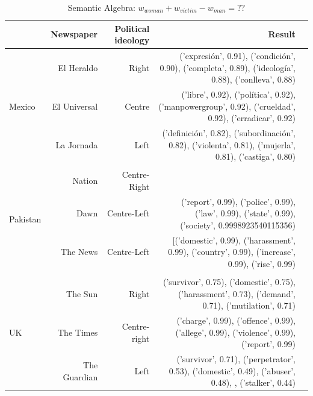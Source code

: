 \documentclass{article}
\begin{document}
{{%
\begin{table}[!htp]\centering
	\caption{Semantic Algebra: $w_{woman}+ w_{victim} - w_{man} = ??$}\label{tab: }
	\scriptsize
	\begin{tabular}{lrrrr}\toprule
		&\textbf{Newspaper} &\textbf{Political ideology} &\textbf{Result} \\\midrule
		\multirow{3}{*}{Mexico} &El Heraldo &Right &('expresión', 0.91), ('condición', 0.90), ('completa', 0.89), ('ideología', 0.88), ('conlleva', 0.88) \\
		&El Universal &Centre &('libre', 0.92), ('política', 0.92), ('manpowergroup', 0.92), ('crueldad', 0.92), ('erradicar', 0.92) \\
		&La Jornada &Left &('definición', 0.82), ('subordinación', 0.82), ('violenta', 0.81), ('mujerla', 0.81), ('castiga', 0.80) \\
		& & &\textbf{} \\
		\multirow{3}{*}{Pakistan} &Nation &Centre-Right & \\
		&Dawn &Centre-Left &('report', 0.99), ('police', 0.99), ('law', 0.99), ('state', 0.99), ('society', 0.9998923540115356) \\
		&The News &Centre-Left &[('domestic', 0.99), ('harassment', 0.99), ('country', 0.99), ('increase', 0.99), ('rise', 0.99) \\
		&\textbf{} &\textbf{} &\textbf{} \\
		\multirow{3}{*}{UK} &The Sun &Right &('survivor', 0.75), ('domestic', 0.75), ('harassment', 0.73), ('demand', 0.71), ('mutilation', 0.71) \\
		&The Times &Centre-right &('charge', 0.99), ('offence', 0.99), ('allege', 0.99), ('violence', 0.99), ('report', 0.99) \\
		&The Guardian &Left &('survivor', 0.71), ('perpetrator', 0.53), ('domestic', 0.49), ('abuser', 0.48), , ('stalker', 0.44) \\
		\bottomrule
	\end{tabular}
\end{table}

}}
\end{document}
